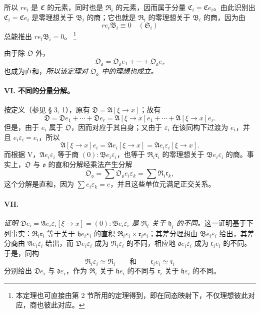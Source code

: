 \documentclass[11pt]{article}
\providecommand{\srcfn}[2]{%
  \begingroup
  \renewcommand{\thefootnote}{#1}%
  \footnote{#2}%
  \addtocounter{footnote}{-1}%
  \endgroup}
\begin{document}
所以 $r e_i$ 是 $\mathfrak C$ 的元素，同时也是 $\mathfrak R_i$ 的元素，因而属于分量 $\mathfrak C_i=\mathfrak C e_i$。由此识别出 $\mathfrak C_i=\mathfrak C e_i$ 是零理想关于 $\mathfrak B_i$ 的商；它也就是 $\mathfrak R_i$ 的零理想关于 $\mathfrak B_i$ 的商，因为由
\[
r e_i\mathfrak B_i\equiv0\quad(\mathfrak S_i)
\]
总能推出 $r e_i\mathfrak B_i=0$。\srcfn{14)}{本定理也可直接由第 2 节所用的定理得到，即在同态映射下，不仅理想彼此对应，商也彼此对应。}由于除 $\mathfrak O$ 外，
\[
\mathfrak O_{\mathfrak o}=\mathfrak O_{\mathfrak o}e_1+\cdots+\mathfrak O_{\mathfrak o}e_r
\]
也成为直和，\emph{所以该定理对 $\mathfrak O_{\mathfrak o}$ 中的理想也成立。}

\paragraph{VI. 不同的分量分解。}
按定义（参见 § 3, 1），原有 $\mathfrak D=\mathfrak A[\xi\to x]$；故有
\[
\mathfrak D=\mathfrak D e_1+\cdots+\mathfrak D e_r
=\mathfrak A[\xi\to x]e_1+\cdots+\mathfrak A[\xi\to x]e_r.
\]
但是，由于 $e_i$ 属于 $\mathfrak O$，因而对应于其自身；又由于 $\varepsilon_i$ 在该同构下过渡为 $e_i$，并且 $e_i\varepsilon_i=e_i$，所以
\[
\mathfrak A[\xi\to x]e_i=\mathfrak A e_i[\xi\to x]
=\mathfrak A e_i\varepsilon_i[\xi\to x].
\]
而根据 V，$\mathfrak A e_i\varepsilon_i$ 等于商 $(0):\mathfrak B e_i\varepsilon_i$，也等于 $\mathfrak R_i\mathfrak r_i$ 的零理想关于 $\mathfrak B e_i\varepsilon_i$ 的商。事实上，$\mathfrak O$ 与 $\mathfrak o$ 的直和分解经乘法产生分解
\[
\mathfrak O_{\mathfrak o}=\sum\mathfrak O_{\mathfrak o}e_i\varepsilon_k
=\sum\mathfrak R_i\mathfrak r_k,
\]
这个分解是直和，因为 $\sum e_i\varepsilon_k=e$，并且这些单位元满足正交关系。

\paragraph{VII.}
\emph{证明 $\mathfrak D e_i=\mathfrak A e_i\varepsilon_i[\xi\to x]=(0):\mathfrak B e_i\varepsilon_i$ 是 $\mathfrak R_i$ 关于 $\mathfrak h_i$ 的不同。}这一证明基于下列事实：$\mathfrak R_i\mathfrak r_i$ 等于关于 $\mathfrak h e_i\varepsilon_i$ 的直积 $\mathfrak R_i\varepsilon_i\times\mathfrak r_i e_i$；其差分理想由 $\mathfrak B e_i\varepsilon_i$ 给出，其差分商由 $\mathfrak A e_i\varepsilon_i$ 给出，而 $\mathfrak D e_i\varepsilon_i$ 成为 $\mathfrak R_i\varepsilon_i$ 的不同，相应地 $\mathfrak d e_i\varepsilon_i$ 成为 $\mathfrak r_i e_i$ 的不同。于是，同构
\[
\mathfrak R_i\varepsilon_i\simeq\mathfrak R_i
\qquad\text{和}\qquad
\mathfrak r_i e_i\simeq\mathfrak r_i
\]
分别给出 $\mathfrak D e_i$ 与 $\mathfrak d\varepsilon_i$，作为 $\mathfrak R_i$ 关于 $\mathfrak h e_i$ 的不同与 $\mathfrak r_i$ 关于 $\mathfrak h\varepsilon_i$ 的不同。
\end{document}
